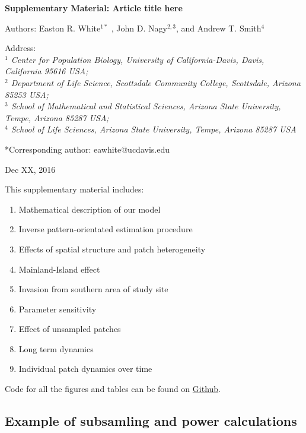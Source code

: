 \documentclass[11pt,]{article}
\title{}
\author{}
\date{}
\providecommand{\tightlist}{%
  \setlength{\itemsep}{0pt}\setlength{\parskip}{0pt}}
\begin{document}
\vspace{2cm}

\begin{center}
 \textbf{Supplementary Material: Article title here}
 
Authors: Easton R. White$^{1*}$ , John D. Nagy$^{2,3}$, and Andrew T. Smith$^4$ 
\vspace{3 mm}

Address: \\ \emph{$^1$ Center for Population Biology, University of California-Davis, Davis, California 95616 USA; \\ $^2$ Department of Life Science, Scottsdale Community College, Scottsdale, Arizona 85253 USA; \\ $^3$ School of Mathematical and Statistical Sciences, Arizona State University, Tempe, Arizona 85287 USA; \\ $^4$ School of Life Sciences, Arizona State University, Tempe, Arizona 85287 USA}

*Corresponding author: eawhite@ucdavis.edu

Dec XX, 2016
 \end{center}

\vspace{2cm}

This supplementary material includes:

\begin{enumerate}
\def\labelenumi{\arabic{enumi}.}
\tightlist
\item
  Mathematical description of our model
\item
  Inverse pattern-orientated estimation procedure
\item
  Effects of spatial structure and patch heterogeneity
\item
  Mainland-Island effect
\item
  Invasion from southern area of study site
\item
  Parameter sensitivity
\item
  Effect of unsampled patches
\item
  Long term dynamics
\item
  Individual patch dynamics over time
\end{enumerate}

Code for all the figures and tables can be found on
\href{https://github.com/erwhite1}{Github}.

\vspace{2cm}

\subsection{Example of subsamling and power
calculations}\label{example-of-subsamling-and-power-calculations}
\end{document}
